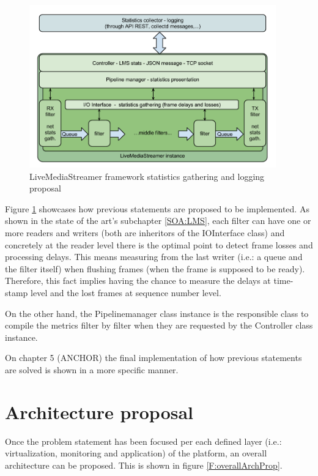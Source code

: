 \begin{figure}[htb]
\begin{center}
\includegraphics[width=0.95\textwidth]{./images/appArch.png}
\caption{LiveMediaStreamer framework statistics gathering and logging proposal}
\label{F:appArch}
\end{center}
\end{figure}

Figure \ref{F:appArch} showcases how previous statements are proposed to be implemented. As shown in the state of the art's subchapter \ref{SOA:LMS}, each filter can have one or more readers and writers (both are inheritors of the IOInterface class) and concretely at the reader level there is the optimal point to detect frame losses and processing delays. This means measuring from the last writer (i.e.: a queue and the filter itself) when flushing frames (when the frame is supposed to be ready). Therefore, this fact implies having the chance to measure the delays at time-stamp level and the lost frames at sequence number level. 

On the other hand, the Pipelinemanager class instance is the responsible class to compile the metrics filter by filter when they are requested by the Controller class instance. 

On chapter 5 (ANCHOR) the final implementation of how previous statements are solved is shown in a more specific manner.

\section{Architecture proposal}

Once the problem statement has been focused per each defined layer (i.e.: virtualization, monitoring and application) of the platform, an overall architecture can be proposed. This is shown in figure \ref{F:overallArchProp}.

